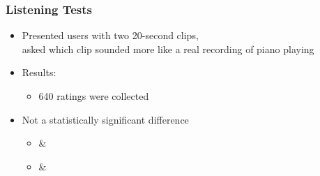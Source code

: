 \documentclass[dvipdfmx]{beamer}
\begin{document}
\begin{frame}
    \frametitle{Listening Tests}
    \begin{itemize}
        \item Presented users with two 20-second clips, \\
            asked which clip sounded more like a real recording of piano playing
    \end{itemize}
    \begin{itemize}
        \item Results:
        \begin{itemize}
            \item 640 ratings were collected
        \end{itemize}
    \end{itemize}
    \begin{itemize}
        \item Not a statistically significant difference
            \begin{itemize}
                \item {} \& 
                \item {} \& 
            \end{itemize}
    \end{itemize}
\end{frame}
\end{document}
